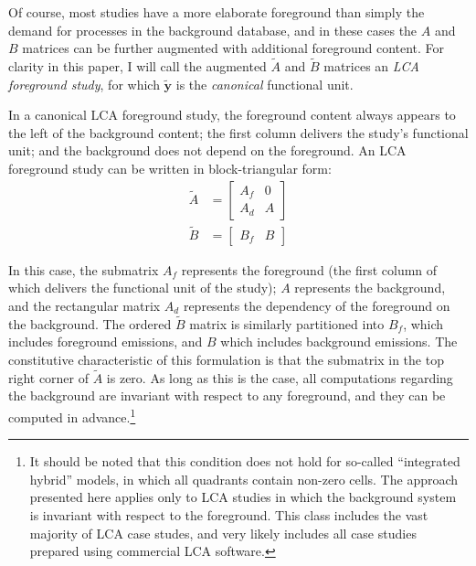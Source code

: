 Of course, most studies have a more elaborate foreground than simply the demand for processes in the background database, and in these cases the $A$ and $B$ matrices can be further augmented with additional foreground content.  For clarity in this paper, I will call the augmented $\tilde{A}$ and $\tilde{B}$ matrices an \emph{LCA foreground study}, for which $\tilde{\mathbf{y}}$ is the \emph{canonical} functional unit.  

In a canonical LCA foreground study, the foreground content always appears to the left of the background content; the first column delivers the study's functional unit; and the background does not depend on the foreground.
An LCA foreground study can be written in block-triangular form:
\begin{eqnarray}
\tilde{A} &= \left[\begin{array}{cc}
A_f & 0 \\
A_d &  A
  \end{array}
\right]\\
  \tilde{B} &= \left[\begin{array}{cc} B_f & B   \end{array}\right]
\label{eqn:foreground}
\end{eqnarray}


In this case, the submatrix $A_f$ represents the foreground (the first column of which delivers the functional unit of the study); $A$ represents the background, and the rectangular matrix $A_d$ represents the dependency of the foreground on the background.  The ordered $\tilde{B}$ matrix is similarly partitioned into $B_f$, which includes foreground emissions, and $B$ which includes background emissions. The constitutive characteristic of this formulation is that the submatrix in the top right corner of $\tilde{A}$ is zero.  As long as this is the case, all computations regarding the background are invariant with respect to any foreground, and they can be computed in advance.\footnote{It should be noted that this condition does not hold for so-called ``integrated hybrid'' models, in which all quadrants contain non-zero cells.  The approach presented here applies only to LCA studies in which the background system is invariant with respect to the foreground. This class includes the vast majority of LCA case studes, and very likely includes all case studies prepared using commercial LCA software.}

